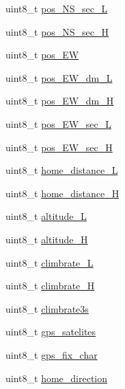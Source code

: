 \begin{DoxyCompactItemize}
\item 
uint8\+\_\+t \hyperlink{structHOTT__GPS__MSG__s_a543700020d43d842b70171855f386dad}{pos\+\_\+\+N\+S\+\_\+sec\+\_\+\+L}
\item 
uint8\+\_\+t \hyperlink{structHOTT__GPS__MSG__s_a8792b270cc8a996c92885812e8a29579}{pos\+\_\+\+N\+S\+\_\+sec\+\_\+\+H}
\item 
uint8\+\_\+t \hyperlink{structHOTT__GPS__MSG__s_a21bd99f74c18c28e5e888629b652f921}{pos\+\_\+\+E\+W}
\item 
uint8\+\_\+t \hyperlink{structHOTT__GPS__MSG__s_afc4cbed485dd3ac4fc7bb2f9cbcf8987}{pos\+\_\+\+E\+W\+\_\+dm\+\_\+\+L}
\item 
uint8\+\_\+t \hyperlink{structHOTT__GPS__MSG__s_a43ada8d5bbe6aacaa3920d37586d3b88}{pos\+\_\+\+E\+W\+\_\+dm\+\_\+\+H}
\item 
uint8\+\_\+t \hyperlink{structHOTT__GPS__MSG__s_a6869effcf785fa4685f06b4ee61b7844}{pos\+\_\+\+E\+W\+\_\+sec\+\_\+\+L}
\item 
uint8\+\_\+t \hyperlink{structHOTT__GPS__MSG__s_a0a6ee09118dad8618e1702601869418c}{pos\+\_\+\+E\+W\+\_\+sec\+\_\+\+H}
\item 
uint8\+\_\+t \hyperlink{structHOTT__GPS__MSG__s_a78e73b68323930de3fa957381aff5f7e}{home\+\_\+distance\+\_\+\+L}
\item 
uint8\+\_\+t \hyperlink{structHOTT__GPS__MSG__s_a26ee981884e9f0a8cbbce7f0d988e896}{home\+\_\+distance\+\_\+\+H}
\item 
uint8\+\_\+t \hyperlink{structHOTT__GPS__MSG__s_aef026bee430708ae3a7d9b284372d571}{altitude\+\_\+\+L}
\item 
uint8\+\_\+t \hyperlink{structHOTT__GPS__MSG__s_a7b69d0eb90c1e83d3f0fb6cace5186cd}{altitude\+\_\+\+H}
\item 
uint8\+\_\+t \hyperlink{structHOTT__GPS__MSG__s_a8062967301d14de40327599cb20c8987}{climbrate\+\_\+\+L}
\item 
uint8\+\_\+t \hyperlink{structHOTT__GPS__MSG__s_af00b68afd747c58b2c00aed8fa5ab392}{climbrate\+\_\+\+H}
\item 
uint8\+\_\+t \hyperlink{structHOTT__GPS__MSG__s_abbd94d353c00c5e3b46d3403fb8e07d1}{climbrate3s}
\item 
uint8\+\_\+t \hyperlink{structHOTT__GPS__MSG__s_a8fcf777b0dea6d702c78deb996525907}{gps\+\_\+satelites}
\item 
uint8\+\_\+t \hyperlink{structHOTT__GPS__MSG__s_a1f63eecd6213b734633f1ef7a25c13ba}{gps\+\_\+fix\+\_\+char}
\item 
uint8\+\_\+t \hyperlink{structHOTT__GPS__MSG__s_a621e490a4cb248d2b5dc8be3dc05363f}{home\+\_\+direction}

\end{DoxyCompactItemize}
